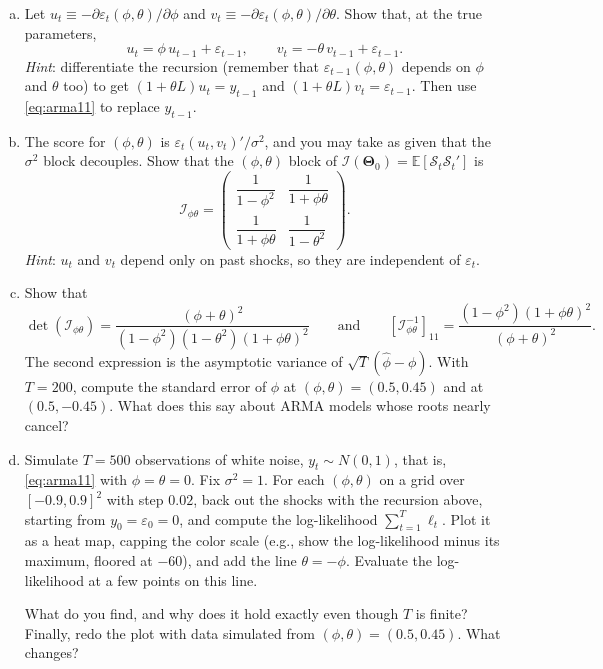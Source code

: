 \documentclass[11pt]{article}
\theoremstyle{definition}
\newcommand{\E}{\mathbb{E}}
\newcommand{\symbf}[1]{\boldsymbol{#1}}
\begin{document}
\begin{enumerate}[a)]
	\item Let $u_t \equiv -\partial \varepsilon_t(\phi, \theta)/\partial \phi$ and $v_t \equiv -\partial \varepsilon_t(\phi, \theta)/\partial \theta$. Show that, at the true parameters,
	\[
		u_t = \phi\, u_{t-1} + \varepsilon_{t-1}, \qquad v_t = -\theta\, v_{t-1} + \varepsilon_{t-1}.
	\]
	\textit{Hint}: differentiate the recursion (remember that $\varepsilon_{t-1}(\phi, \theta)$ depends on $\phi$ and $\theta$ too) to get $(1 + \theta L)u_t = y_{t-1}$ and $(1 + \theta L)v_t = \varepsilon_{t-1}$. Then use \eqref{eq:arma11} to replace $y_{t-1}$.

	\item The score for $(\phi, \theta)$ is $\varepsilon_t (u_t, v_t)'/\sigma^2$, and you may take as given that the $\sigma^2$ block decouples. Show that the $(\phi, \theta)$ block of $\mathcal{I}(\symbf{\Theta}_0) = \E[\mathcal{S}_t \mathcal{S}_t']$ is
	\[
		\mathcal{I}_{\phi\theta} =
		\begin{pmatrix}
			\dfrac{1}{1 - \phi^2} & \dfrac{1}{1 + \phi\theta} \\[1em]
			\dfrac{1}{1 + \phi\theta} & \dfrac{1}{1 - \theta^2}
		\end{pmatrix}.
	\]
	\textit{Hint}: $u_t$ and $v_t$ depend only on past shocks, so they are independent of $\varepsilon_t$.

	\item Show that
	\[
		\det(\mathcal{I}_{\phi\theta}) = \frac{(\phi + \theta)^2}{(1 - \phi^2)(1 - \theta^2)(1 + \phi\theta)^2}
		\qquad \text{and} \qquad
		\left[\mathcal{I}_{\phi\theta}^{-1}\right]_{11} = \frac{(1 - \phi^2)(1 + \phi\theta)^2}{(\phi + \theta)^2}.
	\]
	The second expression is the asymptotic variance of $\sqrt{T}(\hat{\phi} - \phi)$. With $T = 200$, compute the standard error of $\hat{\phi}$ at $(\phi, \theta) = (0.5, 0.45)$ and at $(0.5, -0.45)$. What does this say about ARMA models whose roots nearly cancel?

	\item Simulate $T = 500$ observations of white noise, $y_t \sim N(0, 1)$, that is, \eqref{eq:arma11} with $\phi = \theta = 0$. Fix $\sigma^2 = 1$. For each $(\phi, \theta)$ on a grid over $[-0.9, 0.9]^2$ with step $0.02$, back out the shocks with the recursion above, starting from $y_0 = \varepsilon_0 = 0$, and compute the log-likelihood $\sum_{t=1}^T \ell_t$. Plot it as a heat map, capping the color scale (e.g., show the log-likelihood minus its maximum, floored at $-60$), and add the line $\theta = -\phi$. Evaluate the log-likelihood at a few points on this line. 
	
	What do you find, and why does it hold exactly even though $T$ is finite? Finally, redo the plot with data simulated from $(\phi, \theta) = (0.5, 0.45)$. What changes?
\end{enumerate}
\end{document}
